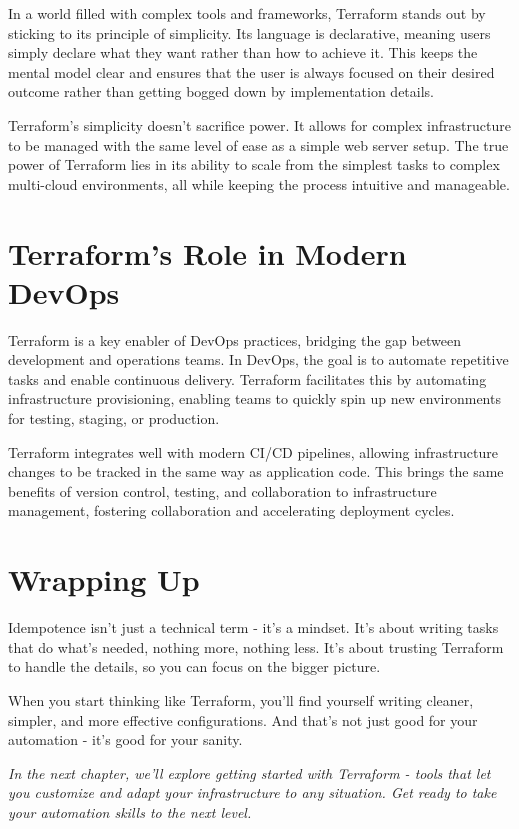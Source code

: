 In a world filled with complex tools and frameworks, Terraform stands out by sticking to its principle of simplicity. Its language is declarative, meaning users simply declare what they want rather than how to achieve it. This keeps the mental model clear and ensures that the user is always focused on their desired outcome rather than getting bogged down by implementation details.

Terraform's simplicity doesn't sacrifice power. It allows for complex infrastructure to be managed with the same level of ease as a simple web server setup. The true power of Terraform lies in its ability to scale from the simplest tasks to complex multi-cloud environments, all while keeping the process intuitive and manageable.

\section{Terraform's Role in Modern DevOps}

Terraform is a key enabler of DevOps practices, bridging the gap between development and operations teams. In DevOps, the goal is to automate repetitive tasks and enable continuous delivery. Terraform facilitates this by automating infrastructure provisioning, enabling teams to quickly spin up new environments for testing, staging, or production.

Terraform integrates well with modern CI/CD pipelines, allowing infrastructure changes to be tracked in the same way as application code. This brings the same benefits of version control, testing, and collaboration to infrastructure management, fostering collaboration and accelerating deployment cycles.

\section{Wrapping Up}

Idempotence isn't just a technical term - it's a mindset. It's about writing tasks that do what's needed, nothing more, nothing less. It's about trusting Terraform to handle the details, so you can focus on the bigger picture.

When you start thinking like Terraform, you'll find yourself writing cleaner, simpler, and more effective configurations. And that's not just good for your automation - it's good for your sanity.


\vspace{1em}
\textit{In the next chapter, we'll explore getting started with Terraform - tools that let you customize and adapt your infrastructure to any situation. Get ready to take your automation skills to the next level.}

